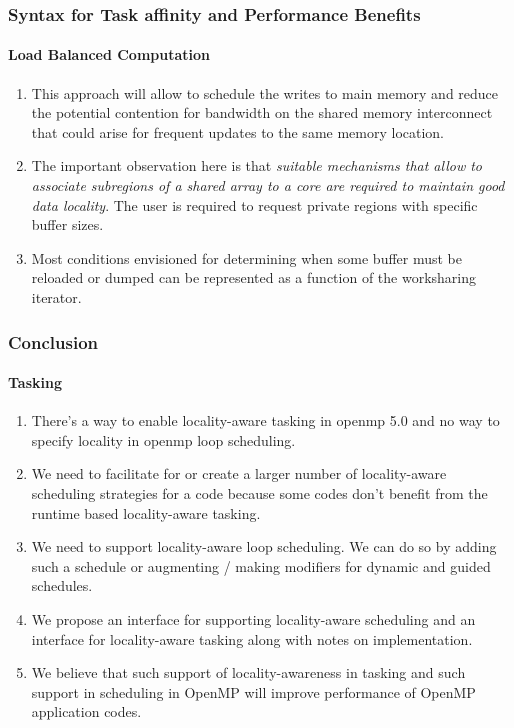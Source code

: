 \begin{frame}
\frametitle{Syntax for Task affinity and Performance Benefits}
\framesubtitle{Load Balanced Computation}
\begin{figure}[ht!]

\end{figure}
\begin{enumerate} 
\tiny \item \tiny This approach will allow to schedule the writes to main memory and reduce the potential contention for bandwidth on the shared memory interconnect that could arise for frequent updates to the same memory location. 
\item \tiny The important observation here is that {\it suitable mechanisms that allow to associate subregions of a shared array to a core are required to maintain good data locality}. The user is required to request private regions with specific buffer sizes.
\item \tiny Most conditions envisioned for determining when some buffer must be reloaded or dumped can be represented as a function of the worksharing iterator.
\end{enumerate}

\end{frame}



\begin{frame}
\frametitle{Conclusion}
\framesubtitle{Tasking}

\begin{enumerate}
   \small \item \small There’s a way to enable locality-aware tasking in openmp 5.0 and no way to specify locality in openmp loop scheduling. 
\item \small We need to facilitate for or create a larger number of locality-aware scheduling strategies for a code because some codes don’t benefit from the runtime based locality-aware tasking. 
\item \small We need to support locality-aware loop scheduling. We can do so by adding such a schedule or augmenting / making modifiers for dynamic and guided schedules.
\item \small We propose an interface for supporting locality-aware scheduling and an interface for locality-aware tasking along with notes on implementation.
\item \small We believe that such support of locality-awareness in tasking and such support in scheduling in OpenMP will improve performance of OpenMP application codes. 
\end{enumerate}

\end{frame} 

